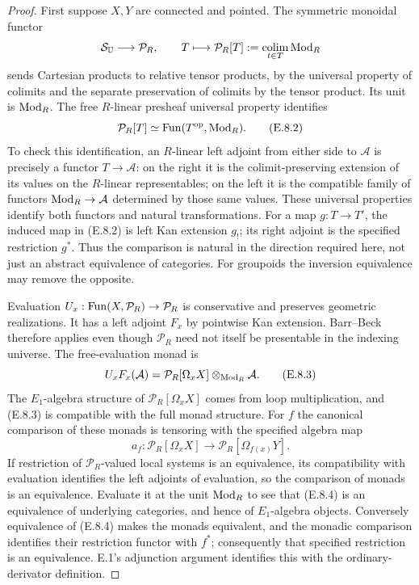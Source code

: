 \begin{proof}
First suppose $X,Y$ are connected and pointed.  The symmetric
monoidal functor
\[
 \mathcal S_\mathbb U\longrightarrow\mathcal P_R,
 \qquad T\longmapsto\mathcal P_R[T]
       :=\operatorname*{colim}_{t\in T}\operatorname{Mod}_R
\]
sends Cartesian products to relative tensor products, by the
universal property of colimits and the separate preservation of
colimits by the tensor product.  Its unit is $\operatorname{Mod}_R$.
The free $R$-linear presheaf universal property identifies
\[
 \mathcal P_R[T]\simeq\operatorname{Fun}(T^{\mathrm{op}},\operatorname{Mod}_R).                   \tag{E.8.2}
\]
To check this identification, an $R$-linear left adjoint from
either side to $\mathcal A$ is precisely a functor
$T\to\mathcal A$: on the right it is the colimit-preserving
extension of its values on the $R$-linear representables; on
the left it is the compatible family of functors
$\operatorname{Mod}_R\to\mathcal A$ determined by those same values.
These universal properties identify both functors and natural
transformations.  For a map $g:T\to T'$, the induced map in
(E.8.2) is left Kan extension $g_!$; its right adjoint is the
specified restriction $g^*$.  Thus the comparison is natural
in the direction required here, not just an abstract equivalence
of categories.  For groupoids the inversion equivalence may
remove the opposite.

Evaluation $U_x:\operatorname{Fun}(X,\mathcal P_R)\to\mathcal P_R$ is
conservative and preserves geometric realizations.  It has a
left adjoint $F_x$ by pointwise Kan extension.  Barr--Beck
therefore applies even though $\mathcal P_R$ need not itself
be presentable in the indexing universe.  The free-evaluation
monad is
\[
 U_xF_x(\mathcal A)
       =\mathcal P_R[\Omega_xX]\otimes_{\operatorname{Mod}_R}\mathcal A.
                                                               \tag{E.8.3}
\]
The $E_1$-algebra structure of $\mathcal P_R[\Omega_xX]$
comes from loop multiplication, and (E.8.3) is compatible with
the full monad structure.  For $f$ the canonical comparison
of these monads is tensoring with the specified algebra map
\[
 a_f:\mathcal P_R[\Omega_xX]\longrightarrow
                     \mathcal P_R[\Omega_{f(x)}Y].            \tag{E.8.4}
\]
If restriction of $\mathcal P_R$-valued local systems is an
equivalence, its compatibility with evaluation identifies the
left adjoints of evaluation, so the comparison of monads is an
equivalence.  Evaluate it at the unit $\operatorname{Mod}_R$ to see that
(E.8.4) is an equivalence of underlying categories, and hence
of $E_1$-algebra objects.  Conversely equivalence of (E.8.4)
makes the monads equivalent, and the monadic comparison
identifies their restriction functor with $f^*$; consequently
that specified restriction is an equivalence.  E.1's adjunction
argument identifies this with the ordinary-derivator definition.


\end{proof}
